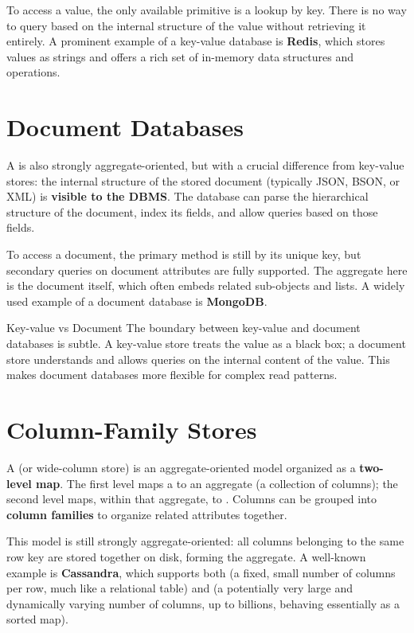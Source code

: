 To access a value, the only available primitive is a lookup by key. There is no way to query based on the internal structure of the value without retrieving it entirely. A prominent example of a key-value database is \textbf{Redis}, which stores values as strings and offers a rich set of in-memory data structures and operations.

\section{Document Databases}
A  is also strongly aggregate-oriented, but with a crucial difference from key-value stores: the internal structure of the stored document (typically JSON, BSON, or XML) is \textbf{visible to the DBMS}. The database can parse the hierarchical structure of the document, index its fields, and allow queries based on those fields.

To access a document, the primary method is still by its unique key, but secondary queries on document attributes are fully supported. The aggregate here is the document itself, which often embeds related sub-objects and lists. A widely used example of a document database is \textbf{MongoDB}.

\begin{note}{Key-value vs Document}
    The boundary between key-value and document databases is subtle. A key-value store treats the value as a black box; a document store understands and allows queries on the internal content of the value. This makes document databases more flexible for complex read patterns.
\end{note}

\section{Column-Family Stores}
A  (or wide-column store) is an aggregate-oriented model organized as a \textbf{two-level map}. The first level maps a  to an aggregate (a collection of columns); the second level maps, within that aggregate,  to . Columns can be grouped into \textbf{column families} to organize related attributes together.

This model is still strongly aggregate-oriented: all columns belonging to the same row key are stored together on disk, forming the aggregate. A well-known example is \textbf{Cassandra}, which supports both  (a fixed, small number of columns per row, much like a relational table) and  (a potentially very large and dynamically varying number of columns, up to billions, behaving essentially as a sorted map).

